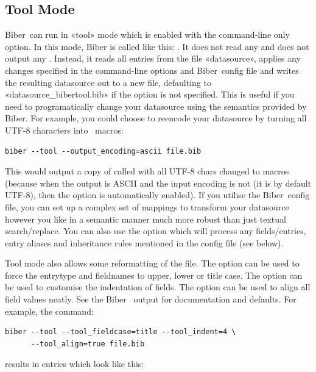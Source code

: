 \documentclass{ltxdockit}
\newcommand*{\biber}{Biber\xspace}
\begin{document}
\subsection{Tool Mode}\label{tool}
\biber\ can run in «tool» mode which is enabled with the 
command-line only option. In this mode, \biber is called like this: . It does not read any  and does not output
any . Instead, it reads all entries from the file
«datasource», applies any changes specified in the command-line
options and \biber\ config file and writes the resulting datasource
out to a new file, defaulting to «datasource\_bibertool.bib» if the
option  is not specified. This is useful if you need to
programatically change your datasource using the semantics provided by
\biber. For example, you could choose to reencode your datasource by
turning all UTF-8 characters into \latex\ macros:

\begin{verbatim}
biber --tool --output_encoding=ascii file.bib
\end{verbatim}

\noindent This would output a copy of  called  with all
UTF-8 chars changed to \latex macros (because when the output is ASCII and
the input encoding is not (it is by default UTF-8), then the
 option is automatically enabled). If you utilise the \biber\
config file, you can set up a complex set of mappings to transform
your datasource however you like in a semantic manner much more robust
than just textual search/replace. You can also use the
 option which will process any 
fields/entries, entry aliases and inheritance rules mentioned in the config
file (see below).

Tool mode also allows some reformatting of the  file. The
option \opt{--tool\_fieldcase} can be used to force the entrytype and
fieldnames to upper, lower or title case. The option
 can be used to customise the indentation of
fields. The option \opt{tool\_align} can be used to align all field
values neatly. See the \biber\ \opt{--help} output for documentation
and defaults. For example, the command:

\begin{verbatim}
biber --tool --tool_fieldcase=title --tool_indent=4 \
      --tool_align=true file.bib
\end{verbatim}
%
results in  entries which look like this:
\end{document}
